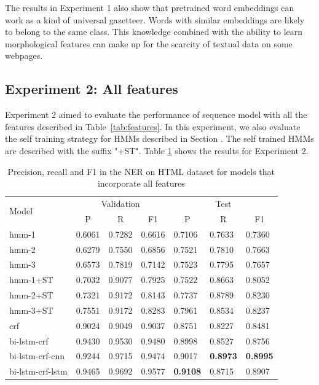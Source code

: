 \documentclass{nle}
\begin{document}
The results in Experiment 1 also show that pretrained word embeddings can work 
as a kind of universal gazetteer. Words with similar embeddings are likely to 
belong to the same class. This knowledge combined with the ability to learn 
morphological features can make up for the scarcity of textual data on some 
webpages.

\subsection{Experiment 2: All features}

Experiment 2 aimed to evaluate the performance of sequence model with all
the features described in Table~\ref{tab:features}. In this experiment, we
also evaluate the self training strategy for HMMs described in Section 
\label{sssec:self_training}. The self trained HMMs are described with the 
suffix "+ST". Table \ref{tab:experiment2} shows the results for Experiment 2.

\begin{table}[h]
  \small
  \begin{center}
    \begin{tabular}{ lllllll }
      \toprule
      \multirow{2}{*}{Model} & \multicolumn{3}{c}{Validation} & \multicolumn{3}{c}{Test} \\
                             & \multicolumn{1}{c}{P} & \multicolumn{1}{c}{R} & \multicolumn{1}{c}{F1}
                             & \multicolumn{1}{c}{P} & \multicolumn{1}{c}{R} & \multicolumn{1}{c}{F1} \\
      \midrule
      hmm-1	         & 0.6061 & 0.7282 & 0.6616 & 0.7106 & 0.7633 & 0.7360 \\
      hmm-2	         & 0.6279 & 0.7550 & 0.6856 & 0.7521 & 0.7810 & 0.7663 \\
      hmm-3	         & 0.6573 & 0.7819 & 0.7142 & 0.7523 & 0.7795 & 0.7657 \\
      hmm-1+ST           & 0.7032 & 0.9077 & 0.7925 & 0.7522 & 0.8663 & 0.8052 \\
      hmm-2+ST           & 0.7321 & 0.9172 & 0.8143 & 0.7737 & 0.8789 & 0.8230 \\
      hmm-3+ST           & 0.7551 & 0.9172 & 0.8283 & 0.7961 & 0.8534 & 0.8237 \\
      crf	         & 0.9024 & 0.9049 & 0.9037 & 0.8751 & 0.8227 & 0.8481 \\
      bi-lstm-crf        & 0.9430 & 0.9530 & 0.9480 & 0.8998 & 0.8527 & 0.8756 \\
      bi-lstm-crf-cnn    & 0.9244 & 0.9715 & 0.9474 & 0.9017 & \textbf{0.8973} & \textbf{0.8995} \\
      bi-lstm-crf-lstm   & 0.9465 & 0.9692 & 0.9577 & \textbf{0.9108} & 0.8715 & 0.8907 \\
      \bottomrule
    \end{tabular}
  \end{center}
  \caption{Precision, recall and F1 in the NER on HTML dataset for models that incorporate all features}
  \label{tab:experiment2}
\end{table}
\end{document}
